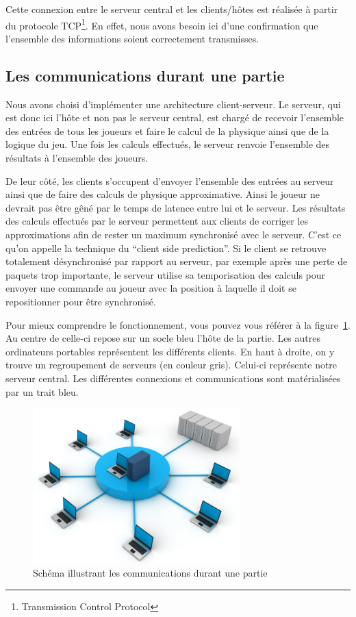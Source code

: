\documentclass[11pt]{report}
\begin{document}
Cette connexion entre le serveur central et les clients/hôtes est réalisée à partir du protocole TCP\footnote{Transmission Control Protocol}. En effet, nous avons besoin ici d'une confirmation que l'ensemble des informations soient correctement transmisses.

\subsection{Les communications durant une partie}

Nous avons choisi d'implémenter une architecture client-serveur. Le serveur, qui est donc ici l'hôte et non pas le serveur central, est chargé de recevoir l'ensemble des entrées de tous les joueurs et faire le calcul de la physique ainsi que de la logique du jeu. Une fois les calculs effectués, le serveur renvoie l'ensemble des résultats à l'ensemble des joueurs.

De leur côté, les clients s'occupent d'envoyer l'ensemble des entrées au serveur ainsi que de faire des calculs de physique approximative. Ainsi le joueur ne devrait pas être gêné par le temps de latence entre lui et le serveur. Les résultats des calculs effectués par le serveur permettent aux clients de corriger les approximations afin de rester un maximum synchronisé avec le serveur. C'est ce qu'on appelle la technique du ``client side prediction''. Si le client se retrouve totalement désynchronisé par rapport au serveur, par exemple après une perte de paquets trop importante, le serveur utilise sa temporisation des calculs pour envoyer une commande au joueur avec la position à laquelle il doit se repositionner pour être synchronisé.

Pour mieux comprendre le fonctionnement, vous pouvez vous référer à la figure~\ref{reseau}. Au centre de celle-ci repose sur un socle bleu l'hôte de la partie. Les autres ordinateurs portables représentent les différents clients. En haut à droite, on y trouve un regroupement de serveurs (en couleur gris). Celui-ci représente notre serveur central. Les différentes connexions et communications sont matérialisées par un trait bleu.

\begin{figure}[htbp]
\centering
\includegraphics[width=8cm]{reseau.jpg}
\caption{Schéma illustrant les communications durant une partie}
\label{reseau}
\end{figure}
\end{document}
